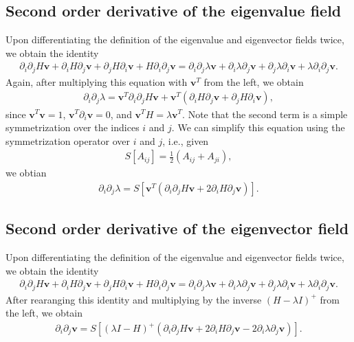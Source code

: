 \documentclass{article}
\begin{document}
\subsection{Second order derivative of the eigenvalue field}
Upon differentiating the definition of the eigenvalue and eigenvector fields twice, we obtain the identity 
\begin{align}
\partial_i \partial_j H \bm{v} + \partial_i H \partial_j \bm{v} + \partial_j H \partial_i \bm{v} + H \partial_i \partial_j \bm{v}
= \partial_i \partial_j \lambda \bm{v} + \partial_i \lambda \partial_j \bm{v}+ \partial_j \lambda \partial_i \bm{v} + \lambda \partial_i \partial_j \bm{v}.
\end{align}
Again, after multiplying this equation with $\bm{v}^T$ from the left, we obtain
\begin{align}
\partial_i \partial_j \lambda 
=
\bm{v}^T\partial_i \partial_j H \bm{v} + \bm{v}^T (\partial_i H \partial_j \bm{v} + \partial_j H \partial_i \bm{v} ),
\end{align}
since $\bm{v}^T\bm{v}=1$, $\bm{v}^T \partial_i \bm{v}=0$, and $\bm{v}^TH=\lambda \bm{v}^T$. Note that the second term is a simple symmetrization over the indices $i$ and $j$. We can simplify this equation using the symmetrization operator over $i$ and $j$, i.e., given
\begin{align}
S[A_{ij}]=\frac{1}{2}(A_{ij}+A_{ji}),
\end{align}
we obtian
\begin{align}
\partial_i \partial_j \lambda = S[\bm{v}^T (\partial_i \partial_j H \bm{v} + 2 \partial_i H \partial_j \bm{v})].
\end{align}

\subsection{Second order derivative of the eigenvector field}
Upon differentiating the definition of the eigenvalue and eigenvector fields twice, we obtain the identity 
\begin{align}
\partial_i \partial_j H \bm{v} + \partial_i H \partial_j \bm{v} + \partial_j H \partial_i \bm{v} + H \partial_i \partial_j \bm{v}
= \partial_i \partial_j \lambda \bm{v} + \partial_i \lambda \partial_j \bm{v}+ \partial_j \lambda \partial_i \bm{v} + \lambda \partial_i \partial_j \bm{v}.
\end{align}
After rearanging this identity and multiplying by the inverse $(H-\lambda I)^+$ from the left, we obtain
\begin{align}
\partial_i \partial_j \bm{v} = S[(\lambda I - H)^+ ( 
\partial_i \partial_j H \bm{v}  
+2 \partial_i H \partial_j \bm{v} 
- 2\partial_i \lambda \partial_j \bm{v})].
\end{align}
\end{document}
